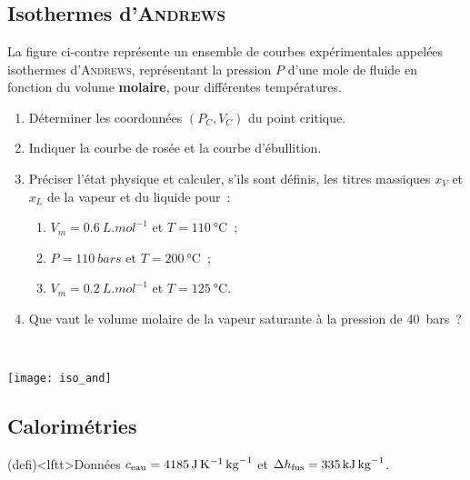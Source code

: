 \documentclass[a4paper, 10pt, final, garamond]{book}
\begin{document}
\setcounter{chapter}{5}


\chapter{}

\section{Isothermes d'\textsc{Andrews}}

\begin{minipage}[t]{.60\linewidth}
	La figure ci-contre représente un ensemble de courbes expérimentales appelées
	isothermes d'\textsc{Andrews}, représentant la pression $P$ d'une mole de
	fluide en fonction du volume \textbf{molaire}, pour différentes températures.
	\smallbreak
	\begin{enumerate}
		\item Déterminer les coordonnées $(P_C,V_C)$ du point critique.
		\item Indiquer la courbe de rosée et la courbe d'ébullition.
		\item Préciser l'état physique et calculer, s'ils sont définis, les titres
		      massiques $x_V$ et $x_L$ de la vapeur et du liquide pour~:
		      \begin{enumerate}
			      \item $V_m = \SI{0.6}{L.mol^{-1}}$ et $T = \SI{110}{\degreeCelsius}$~;
			      \item $P = \SI{110}{bars}$ et $T = \SI{200}{\degreeCelsius}$~;
			      \item $V_m = \SI{0.2}{L.mol^{-1}}$ et $T = \SI{125}{\degreeCelsius}$.
		      \end{enumerate}
		\item Que vaut le volume molaire de la vapeur saturante à la pression de
		      \SI{40}{bars}~?
	\end{enumerate}
\end{minipage}
\begin{minipage}[t]{.40\linewidth}
	~
	\vspace*{-10pt}
	\begin{center}
		\texttt{[image: iso\_and]}
		\label{fig:isoand}
	\end{center}
\end{minipage}

\section{Calorimétries}
\begin{tcn}(defi)<lftt>{Données}
	$c_{\rm eau} = \SI{4185}{J.K^{-1}.kg^{-1}}$ et $\Delta{h_{\rm fus}} =
		\SI{335}{kJ.kg^{-1}}$.
\end{tcn}
\end{document}
